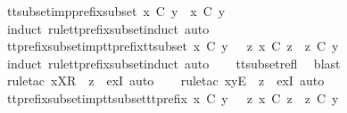 \endisatagproof
{\isafoldproof}%
%
\isadelimproof
\isanewline
%
\endisadelimproof
\isanewline
{}\isamarkupfalse%
\ tt{\isacharunderscore}subset{\isacharunderscore}imp{\isacharunderscore}prefix{\isacharunderscore}subset{\isacharcolon}\ {\isachardoublequoteopen}x\ {\isasymsubseteq}\isactrlsub C\ y\ {\isasymLongrightarrow}\ x\ {\isasymlesssim}\isactrlsub C\ y{\isachardoublequoteclose}\isanewline
%
\isadelimproof
\ \ %
\endisadelimproof
%
\isatagproof
{}\isamarkupfalse%
\ {\isacharparenleft}induct\ rule{\isacharcolon}tt{\isacharunderscore}prefix{\isacharunderscore}subset{\isachardot}induct{\isacharcomma}\ auto{\isacharparenright}%
\endisatagproof
{\isafoldproof}%
%
\isadelimproof
\isanewline
%
\endisadelimproof
\isanewline
{}\isamarkupfalse%
\ tt{\isacharunderscore}prefix{\isacharunderscore}subset{\isacharunderscore}imp{\isacharunderscore}tt{\isacharunderscore}prefix{\isacharunderscore}tt{\isacharunderscore}subset{\isacharcolon}\ {\isachardoublequoteopen}x\ {\isasymlesssim}\isactrlsub C\ y\ {\isasymLongrightarrow}\ {\isasymexists}\ z{\isachardot}\ x\ {\isasymle}\isactrlsub C\ z\ {\isasymand}\ z\ {\isasymsubseteq}\isactrlsub C\ y{\isachardoublequoteclose}\isanewline
%
\isadelimproof
\ \ %
\endisadelimproof
%
\isatagproof
{}\isamarkupfalse%
\ {\isacharparenleft}induct\ rule{\isacharcolon}tt{\isacharunderscore}prefix{\isacharunderscore}subset{\isachardot}induct{\isacharcomma}\ auto{\isacharparenright}\isanewline
\ \ \isamarkupfalse%
\ tt{\isacharunderscore}subset{\isacharunderscore}refl\ \isamarkupfalse%
\ blast\isanewline
\ \ \isamarkupfalse%
\ {\isacharparenleft}rule{\isacharunderscore}tac\ x{\isacharequal}{\isachardoublequoteopen}{\isacharbrackleft}X{\isacharbrackright}\isactrlsub R\ {\isacharhash}\ z{\isachardoublequoteclose}\ \ exI{\isacharcomma}\ auto{\isacharparenright}\isanewline
\ \ \isamarkupfalse%
\ {\isacharparenleft}rule{\isacharunderscore}tac\ x{\isacharequal}{\isachardoublequoteopen}{\isacharbrackleft}y{\isacharbrackright}\isactrlsub E\ {\isacharhash}\ z{\isachardoublequoteclose}\ \ exI{\isacharcomma}\ auto{\isacharparenright}\isanewline
\ \ \isamarkupfalse%
%
\endisatagproof
{\isafoldproof}%
%
\isadelimproof
\isanewline
%
\endisadelimproof
\isanewline
{}\isamarkupfalse%
\ tt{\isacharunderscore}prefix{\isacharunderscore}subset{\isacharunderscore}imp{\isacharunderscore}tt{\isacharunderscore}subset{\isacharunderscore}tt{\isacharunderscore}prefix{\isacharcolon}\ {\isachardoublequoteopen}x\ {\isasymlesssim}\isactrlsub C\ y\ {\isasymLongrightarrow}\ {\isasymexists}\ z{\isachardot}\ x\ {\isasymsubseteq}\isactrlsub C\ z\ {\isasymand}\ z\ {\isasymle}\isactrlsub C\ y{\isachardoublequoteclose}\isanewline
